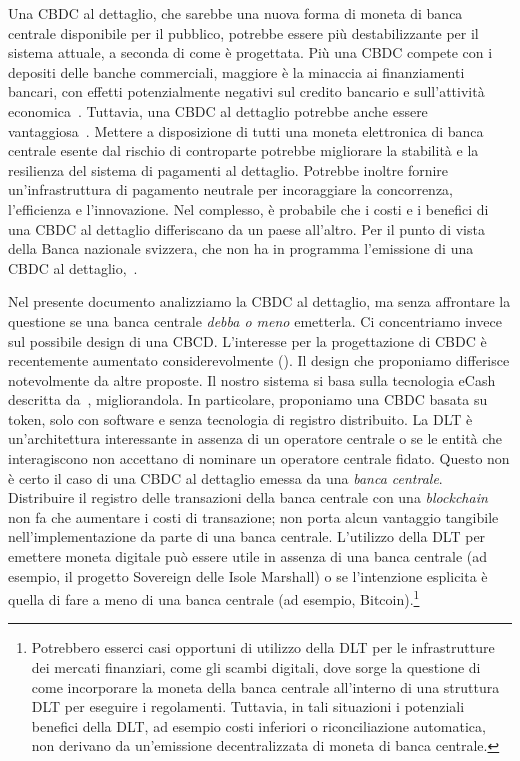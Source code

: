 \documentclass{article}
\begin{document}
Una CBDC al dettaglio, che sarebbe una nuova forma di moneta di banca 
centrale disponibile per il pubblico, potrebbe essere più destabilizzante 
per il sistema attuale, a seconda di come è progettata. Più una CBDC 
compete con i depositi delle banche commerciali, maggiore è la minaccia 
ai finanziamenti bancari, con effetti potenzialmente negativi sul credito 
bancario e sull'attività economica~\cite[vedi][]{Agur}. Tuttavia, una 
CBDC al dettaglio potrebbe anche essere vantaggiosa~\cite[vedi][]{Bordo,Berentsen,Bindseil,Niepelt,Riksbank,BoE}. 
Mettere a disposizione di tutti una moneta elettronica di banca centrale 
esente dal rischio di controparte potrebbe migliorare la stabilità e la 
resilienza del sistema di pagamenti al dettaglio. Potrebbe inoltre fornire 
un'infrastruttura di pagamento neutrale per incoraggiare la concorrenza, 
l'efficienza e l'innovazione. Nel complesso, è probabile che i costi e i 
benefici di una CBDC al dettaglio differiscano da un paese all'altro. Per 
il punto di vista della Banca nazionale svizzera, che non ha in programma 
l'emissione di una CBDC al dettaglio,~\cite[si veda][]{Jordan}.

Nel presente documento analizziamo la CBDC al dettaglio, ma senza 
affrontare la questione se una banca centrale \emph{debba o meno} emetterla. 
Ci concentriamo invece sul possibile design di una CBCD. L'interesse 
per la progettazione di CBDC è recentemente aumentato 
considerevolmente (\cite[si, veda ad esempio,][]{Allen,BoE}). Il design che 
proponiamo differisce notevolmente da altre proposte. Il nostro sistema 
si basa sulla tecnologia eCash descritta da~\cite{Chaum1983,Chaum1990}, 
migliorandola. In particolare, proponiamo una CBDC basata su token, solo 
con software e senza tecnologia di registro distribuito. La DLT è 
un'architettura interessante in assenza di un operatore centrale o se le 
entità che interagiscono non accettano di nominare un operatore centrale 
fidato. Questo non è certo il caso di una CBDC al dettaglio emessa da una 
\emph{banca centrale}. Distribuire il registro delle transazioni della 
banca centrale con una \textit{blockchain} non fa che aumentare i costi 
di transazione; non porta alcun vantaggio tangibile nell'implementazione 
da parte di una banca centrale. L'utilizzo della DLT per emettere moneta 
digitale può essere utile in assenza di una banca centrale (ad esempio, 
il progetto Sovereign delle Isole Marshall) o se l'intenzione esplicita 
è quella di fare a meno di una banca centrale (ad esempio, 
Bitcoin).\footnote{Potrebbero esserci casi opportuni di utilizzo della 
DLT per le infrastrutture dei mercati finanziari, come gli scambi digitali, 
dove sorge la questione di come incorporare la moneta della banca centrale 
all'interno di una struttura DLT per eseguire i regolamenti. Tuttavia, 
in tali situazioni i potenziali benefici della DLT, ad esempio costi 
inferiori o riconciliazione automatica, non derivano da un'emissione 
decentralizzata di moneta di banca centrale.}
\end{document}
